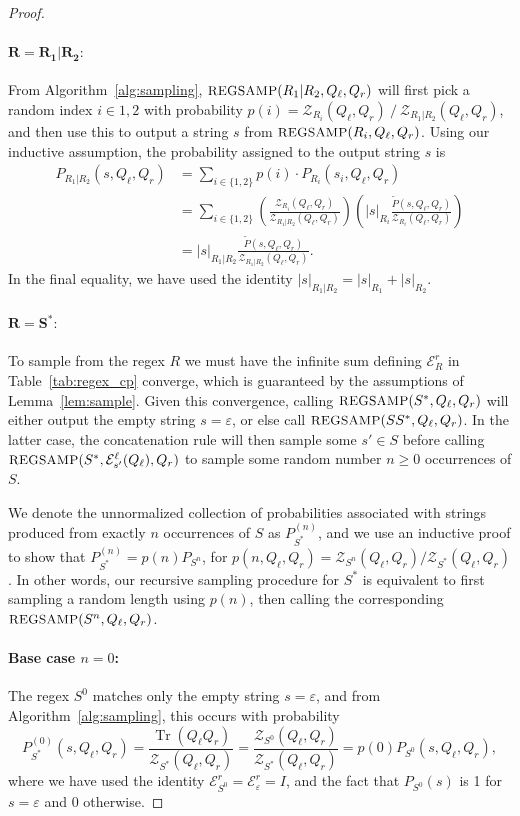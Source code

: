 \documentclass[twoside]{article}
\newcommand{\Sample}{\textsc{\small REGSAMP}}
\DeclareMathOperator{\Tr}{Tr}
\newcommand{\EL}{\mc{E}^{\scriptstyle \ell}}
\newcommand{\ER}{\mc{E}^{\scriptstyle r}}
\newcommand{\QL}{Q_{\ell}}
\newcommand{\QR}{Q_{r}}
\newcommand{\Pt}{\tilde{P}}
\newcommand{\mc}[1]{\mathcal{#1}}
\begin{document}
\begin{proof}
\paragraph{$\mathbf{R = R_1 | R_2:}$} From Algorithm~\ref{alg:sampling},
$\Sample(R_1 | R_2, \QL, \QR)$ will first pick a random index $i \in {1, 2}$ with probability $p(i) = \mc{Z}_{R_i}(\QL, \QR) \ / \ \mc{Z}_{R_1 | R_2}(\QL, \QR)$, and then use this to output a string $s$ from $\Sample(R_i, \QL, \QR)$. Using our inductive assumption, the probability assigned to the output string $s$ is
%
\begin{align*}
    P_{R_1 | R_2}(s, \QL, \QR) &= \sum_{i \in \{1, 2\}} p(i) \cdot P_{R_i}(s_i, \QL, \QR) \\
    &= \sum_{i \in \{1, 2\}} \left( \frac{\mc{Z}_{R_i}(\QL, \QR)}{\mc{Z}_{R_1 | R_2}(\QL, \QR)} \right) \left( |s|_{R_i} \frac{\Pt(s, \QL, \QR)}{\mc{Z}_{R_i}(\QL, \QR)} \right) \\
    &= |s|_{R_1 | R_2} \frac{\Pt(s, \QL, \QR)}{\mc{Z}_{R_1 | R_2}(\QL, \QR)}.
\end{align*}
%
In the final equality, we have used the identity $|s|_{R_1 | R_2} = |s|_{R_1} + |s|_{R_2}$.

\paragraph{$\mathbf{R = S^*:}$} To sample from the regex $R$ we must have the infinite sum defining $\ER_R$ in Table~\ref{tab:regex_cp} 
converge, which is guaranteed by the assumptions of Lemma~\ref{lem:sample}. Given this convergence, calling $\Sample(S^*, \QL, \QR)$ will either output the empty string $s = \varepsilon$, or else call $\Sample(SS^*, \QL, \QR)$. In the latter case, the concatenation rule will then sample some $s' \in S$ before calling $\Sample(S^*, \EL_{s'}(\QL), \QR)$ to sample some random number $n \geq 0$ occurrences of $S$.

We denote the unnormalized collection of probabilities associated with strings produced from exactly $n$ occurrences of $S$ as $P_{S^*}^{(n)}$, and we use an inductive proof to show that $P_{S^*}^{(n)} = p(n) P_{S^n}$, for $p(n, \QL, \QR) = \mc{Z}_{S^n}(\QL, \QR) / \mc{Z}_{S^*}(\QL, \QR)$. In other words, our recursive sampling procedure for $S^*$ is equivalent to first sampling a random length using $p(n)$, then calling the corresponding $\Sample(S^n, \QL, \QR)$.

\paragraph{\textbf{Base case} $n = 0$: } The regex $S^0$ matches only the empty string $s = \varepsilon$, and from Algorithm~\ref{alg:sampling},
this occurs with probability
%
\begin{equation*}
    P_{S^*}^{(0)}(s, \QL, \QR) = \frac{\Tr(\QL \QR)}{\mc{Z}_{S^*}(\QL, \QR)} = \frac{\mc{Z}_{S^0}(\QL, \QR)}{\mc{Z}_{S^*}(\QL, \QR)} = p(0) P_{S^0}(s, \QL, \QR),
\end{equation*}
%
where we have used the identity $\ER_{S^0} = \ER_\varepsilon = I$, and the fact that $P_{S^0}(s)$ is 1 for $s = \varepsilon$ and 0 otherwise. 


\end{proof}
\end{document}
